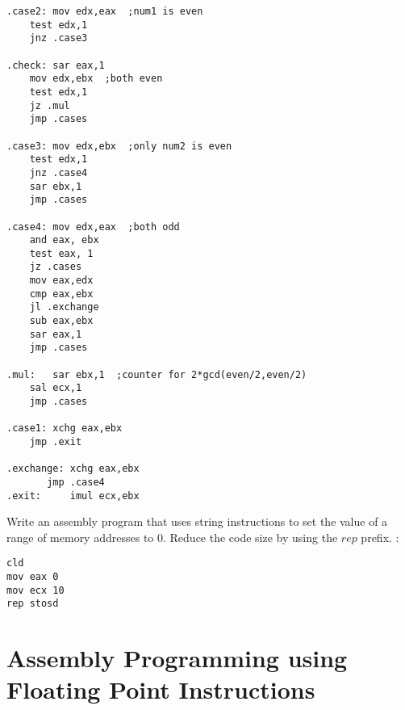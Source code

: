 \begin{ExerciseList}
\begin{Verbatim}[frame=single]
.case2: mov edx,eax  ;num1 is even
	test edx,1
	jnz .case3

.check: sar eax,1
	mov edx,ebx  ;both even
	test edx,1
	jz .mul
	jmp .cases

.case3: mov edx,ebx  ;only num2 is even 
	test edx,1
	jnz .case4
	sar ebx,1
	jmp .cases
	
.case4: mov edx,eax  ;both odd
	and eax, ebx
	test eax, 1
	jz .cases
	mov eax,edx
	cmp eax,ebx
	jl .exchange
	sub eax,ebx
	sar eax,1
	jmp .cases
	
.mul:   sar ebx,1  ;counter for 2*gcd(even/2,even/2)
	sal ecx,1
	jmp .cases

.case1: xchg eax,ebx
	jmp .exit

.exchange: xchg eax,ebx
	   jmp .case4
.exit:     imul ecx,ebx
\end{Verbatim}
\Exercise
Write an assembly program that uses string instructions to set the value of a range of memory addresses to 0.
Reduce the code size by using the $rep$ prefix.
\Answer :
\begin{Verbatim}[frame=single]
cld  
mov eax 0  
mov ecx 10  
rep stosd
\end{Verbatim}

\end{ExerciseList}


\section*{Assembly Programming using Floating Point Instructions}

